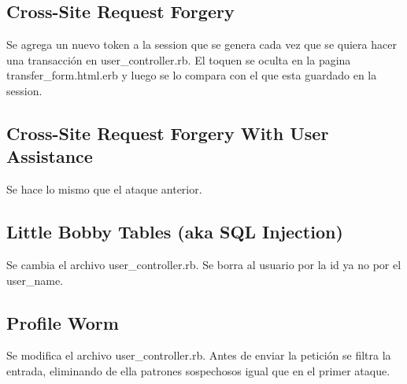 \documentclass[a4paper,12pt]{article}
\begin{document}
\subsection{Cross-Site Request Forgery}
Se agrega un nuevo token a la session que se genera cada vez que se quiera hacer una transacción en user\_controller.rb. El toquen se oculta
en la pagina transfer\_form.html.erb y luego se lo compara con el que esta guardado en la session.
\subsection{Cross-Site Request Forgery With User Assistance}
Se hace lo mismo que el ataque anterior.
\subsection{Little Bobby Tables (aka SQL Injection)}
Se cambia el archivo user\_controller.rb. Se borra al usuario por la id ya no por el user\_name.
\subsection{Profile Worm}
Se modifica el archivo user\_controller.rb. Antes de enviar la petición se filtra la entrada, eliminando de ella patrones sospechosos igual que 
en el primer ataque.
\end{document}
